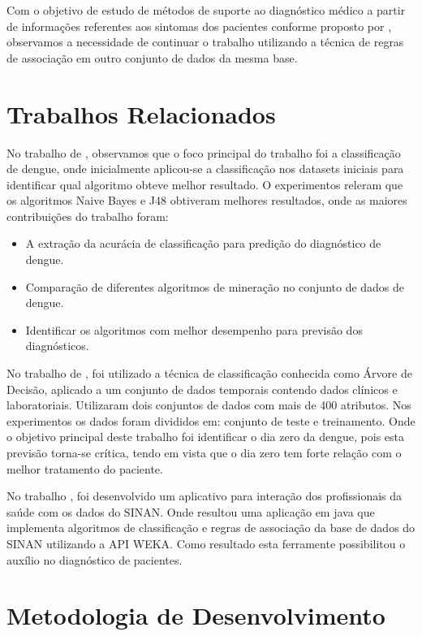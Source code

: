 \documentclass[
	12pt,				%
	openright,			%
	oneside,	
	a4paper,				%
	english,				%
	brazil				%
]{abntex2/abntex2} %
\begin{document}
	Com o objetivo de estudo de métodos de suporte ao diagnóstico médico a partir de informações referentes aos sintomas dos pacientes conforme proposto por \cite{alexander:2013}, observamos a necessidade de continuar o trabalho utilizando a técnica de regras de associação em outro conjunto de dados da mesma base.
	
	\section{Trabalhos Relacionados}	
	
	No trabalho de \cite{shakil:2015}, observamos que o foco principal do trabalho foi a classificação de dengue, onde inicialmente aplicou-se a classificação nos datasets iniciais para identificar qual algoritmo obteve melhor resultado. O experimentos releram que os algoritmos Naive Bayes e J48 obtiveram melhores resultados, onde as maiores contribuições do trabalho foram:
	
	\begin{itemize}
		\item A extração da acurácia de classificação para predição do diagnóstico de dengue.
		\item Comparação de diferentes algoritmos de mineração no conjunto de dados de dengue.
		\item Identificar os algoritmos com melhor desempenho para previsão dos diagnósticos.
	\end{itemize}
	
	No trabalho de \cite{thitiprayoonwongse:2012}, foi utilizado a técnica de classificação conhecida como Árvore de Decisão, aplicado a um conjunto de dados temporais contendo dados clínicos e laboratoriais. Utilizaram dois conjuntos de dados com mais de 400 atributos. Nos experimentos os dados foram divididos em: conjunto de teste e treinamento. Onde o objetivo principal deste trabalho foi identificar o dia zero da dengue, pois esta previsão torna-se crítica, tendo em vista que o dia zero tem forte relação com o melhor tratamento do paciente.
	

	No trabalho \cite{santos:2011}, foi desenvolvido um aplicativo para interação dos profissionais da saúde com os dados do SINAN. Onde resultou uma aplicação em java que implementa algoritmos de classificação e regras de associação da base de dados do SINAN utilizando a API WEKA. Como resultado esta ferramente possibilitou o auxílio no diagnóstico de pacientes.

	\section{Metodologia de Desenvolvimento}
		
\end{document}
